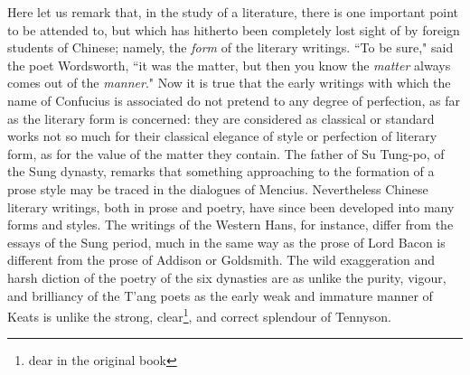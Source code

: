 Here let us remark that, in the study of a literature, there is one important point to be attended to, but which has hitherto been completely lost sight of by foreign students of Chinese; namely, the \emph{form} of the literary writings.
``To be sure," said the poet Wordsworth,  ``it was the matter, but then you know the \emph{matter} always comes out of the \emph{manner}."
Now it is true that the early writings with which the name of Confucius is associated do not pretend to any degree of perfection, as far as the literary form is concerned: they are considered as classical or standard works not so much for their classical elegance of style or perfection of literary form, as for the value of the matter they contain.
The father of Su Tung-po,  of the Sung dynasty, remarks that something approaching to the formation of a prose style may be traced in the dialogues of Mencius.
Nevertheless Chinese literary writings, both in prose and poetry, have since been developed into many forms and styles.
The writings of the Western Hans,  for instance, differ from the essays of the Sung period, much in the same way as the prose of Lord Bacon  is different from the prose of Addison  or Goldsmith. 
The wild exaggeration and harsh diction of the poetry of the six dynasties are as unlike the purity, vigour, and brilliancy of the T'ang poets as the early weak and immature manner of Keats  is unlike the strong, clear\footnote{dear in the original book}, and correct splendour of Tennyson. 

